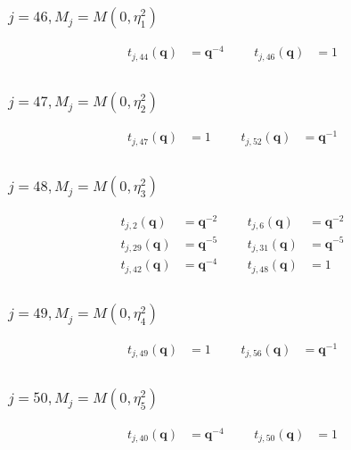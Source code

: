 \subsubsection{$j=46, M_{j}=M(0,\eta^{2}_{1})$}
\begin{align*}
t_{j,44}(\boldsymbol{q})&=\boldsymbol{q}^{-4} &&& t_{j,46}(\boldsymbol{q})&=1 \\
\end{align*}

\subsubsection{$j=47, M_{j}=M(0,\eta^{2}_{2})$}
\begin{align*}
t_{j,47}(\boldsymbol{q})&=1 &&& t_{j,52}(\boldsymbol{q})&=\boldsymbol{q}^{-1} \\
\end{align*}

\subsubsection{$j=48, M_{j}=M(0,\eta^{2}_{3})$}
\begin{align*}
t_{j,2}(\boldsymbol{q})&=\boldsymbol{q}^{-2} &&& t_{j,6}(\boldsymbol{q})&=\boldsymbol{q}^{-2} \\
t_{j,29}(\boldsymbol{q})&=\boldsymbol{q}^{-5} &&& t_{j,31}(\boldsymbol{q})&=\boldsymbol{q}^{-5} \\
t_{j,42}(\boldsymbol{q})&=\boldsymbol{q}^{-4} &&& t_{j,48}(\boldsymbol{q})&=1 \\
\end{align*}

\subsubsection{$j=49, M_{j}=M(0,\eta^{2}_{4})$}
\begin{align*}
t_{j,49}(\boldsymbol{q})&=1 &&& t_{j,56}(\boldsymbol{q})&=\boldsymbol{q}^{-1} \\
\end{align*}

\subsubsection{$j=50, M_{j}=M(0,\eta^{2}_{5})$}
\begin{align*}
t_{j,40}(\boldsymbol{q})&=\boldsymbol{q}^{-4} &&& t_{j,50}(\boldsymbol{q})&=1 \\
\end{align*}

